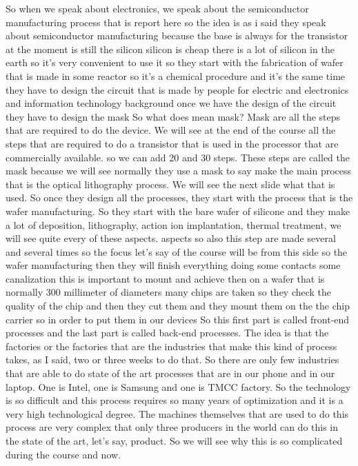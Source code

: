 So when we speak about electronics, we speak about the semiconductor manufacturing process that is report here so the idea is as i said they speak about semiconductor manufacturing because the base is always for the transistor at the moment is still the silicon silicon is cheap there is a lot of silicon in the earth so it's very convenient to use it so they start with the fabrication of wafer that is made in some reactor so it's a chemical procedure and it's the same time they have to design the circuit that is made by people for electric and electronics and information technology background once we have the design of the circuit they have to design the mask So what does mean mask? Mask are all the steps that are required to do the device. We will see at the end of the course all the steps that are required to do a transistor that is used in the processor that are commercially available. so we can add 20 and 30 steps. These steps are called the mask because we will see normally they use a mask to say make the main process that is the optical lithography process. We will see the next slide what that is used. So once they design all the processes, they start with the process that is the wafer manufacturing. So they start with the bare wafer of silicone and they make a lot of deposition, lithography, action ion implantation, thermal treatment, we will see quite every of these aspects. aspects so also this step are made several and several times so the focus let's say of the course will be from this side so the wafer manufacturing then they will finish everything doing some contacts some canalization this is important to mount and achieve then on a wafer that is normally 300 millimeter of diameters many chips are taken so they check the quality of the chip and then they cut them and they mount them on the the chip carrier so in order to put them in our devices So this first part is called front-end processes and the last part is called back-end processes. The idea is that the factories or the factories that are the industries that make this kind of process takes, as I said, two or three weeks to do that. So there are only few industries that are able to do state of the art processes that are in our phone and in our laptop. One is Intel, one is Samsung and one is TMCC factory. So the technology is so difficult and this process requires so many years of optimization and it is a very high technological degree. The machines themselves that are used to do this process are very complex that only three producers in the world can do this in the state of the art, let's say, product. So we will see why this is so complicated during the course and now.
